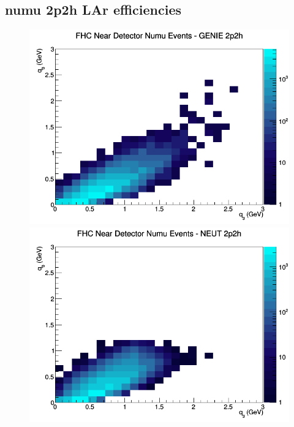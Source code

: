 \documentclass[12pt]{article}
\begin{document}
\subsection{numu 2p2h LAr efficiencies}
\begin{figure}[h]
\includegraphics[width=\linewidth]{eff_q0_q3/LAr/2p2h_FHC_ND_numu_q3_q0_GENIE.png}
\endminipage
{}
\includegraphics[width=\linewidth]{eff_q0_q3/LAr/2p2h_FHC_ND_numu_q3_q0_NEUT.png}
\endminipage
{}

\end{figure}
\end{document}
